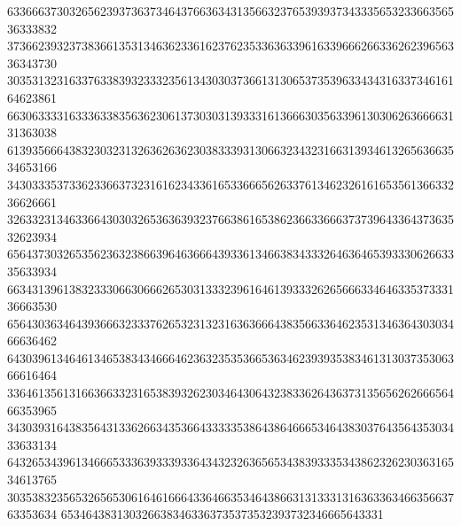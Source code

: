 63366637303265623937363734643766363431356632376539393734333565323366356536333832
37366239323738366135313463623361623762353363633961633966626633626239656336343730
30353132316337633839323332356134303037366131306537353963343431633734616164623861
66306333316333633835636230613730303139333161366630356339613030626366663131363038
61393566643832303231326362636230383339313066323432316631393461326563663534653166
34303335373362336637323161623433616533666562633761346232616165356136633236626661
32633231346336643030326536363932376638616538623663366637373964336437363532623934
65643730326535623632386639646366643933613466383433326463646539333062663335633934
66343139613832333066306662653031333239616461393332626566633464633537333136663530
65643036346439366632333762653231323163636664383566336462353134636430303466636462
64303961346461346538343466646236323535366536346239393538346131303735306366616464
33646135613166366332316538393262303464306432383362643637313565626266656466353965
34303931643835643133626634353664333335386438646665346438303764356435303433633134
64326534396134666533363933393364343232636565343839333534386232623036316534613765
30353832356532656530616461666433646635346438663131333131636336346635663763353634
6534643831303266383463363735373532393732346665643331
